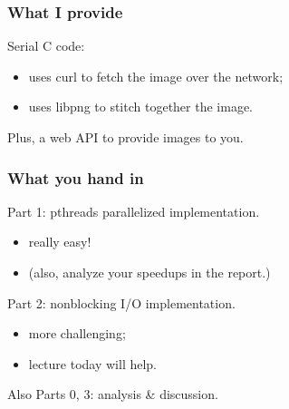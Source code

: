 \documentclass[aspectratio=43]{beamer}
\newenvironment{changemargin}[1]{%
  \begin{list}{}{%
    \setlength{\topsep}{0pt}%
    \setlength{\leftmargin}{#1}%
    \setlength{\rightmargin}{1em}
    \setlength{\listparindent}{\parindent}%
    \setlength{\itemindent}{\parindent}%
    \setlength{\parsep}{\parskip}%
  }%
  \item[]}{\end{list}}
\begin{document}


\begin{frame}
  \frametitle{What I provide}

  \begin{changemargin}{2em}
    Serial C code:
\begin{itemize}
  \item uses curl to fetch the image over the network;
  \item uses libpng to stitch together the image.
\end{itemize}
    Plus, a web API to provide images to you.

  \end{changemargin}

\end{frame}


\begin{frame}
  \frametitle{What you hand in}

  \begin{changemargin}{2em}
    Part 1: pthreads parallelized implementation.\\
\begin{itemize}
  \item really easy!
  \item (also, analyze your speedups in the report.)
\end{itemize}

    Part 2: nonblocking I/O implementation.\\
\begin{itemize}
  \item more challenging;
  \item lecture today will help.
\end{itemize}

Also Parts 0, 3: analysis \& discussion.

  \end{changemargin}

\end{frame}

\end{document}
